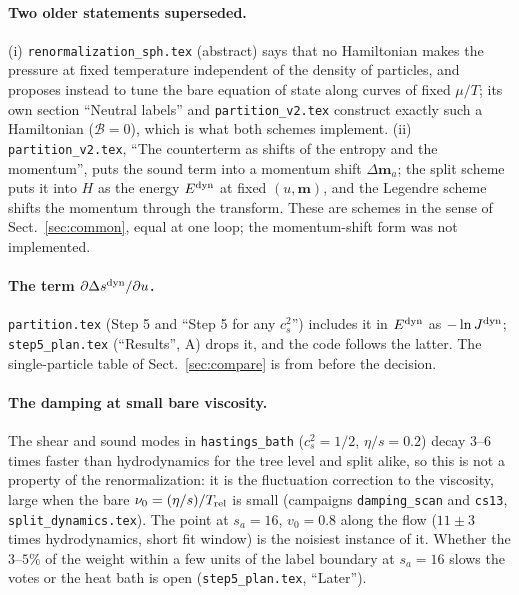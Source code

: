 \documentclass[11pt,aps,preprint,nofootinbib,superscriptaddress,tightenlines]{revtex4-2}
\newcommand{\klab}{\mathcal B}
\def\Sect#1{Sect.~\ref{#1}}
\let\oldparagraph\paragraph
\renewcommand{\paragraph}{\par\bigskip\oldparagraph}
\begin{document}
\paragraph{Two older statements superseded.}  (i) \nolinkurl{renormalization_sph.tex} (abstract) says that no Hamiltonian makes the pressure at fixed
temperature independent of the density of particles, and proposes instead to tune the bare equation of state along curves of fixed $\mu/T$; its own
section ``Neutral labels'' and \nolinkurl{partition_v2.tex} construct exactly such a Hamiltonian ($\klab=0$), which is what both schemes implement.
(ii) \nolinkurl{partition_v2.tex}, ``The counterterm as shifts of the entropy and the momentum'', puts the sound term into a momentum shift
$\Delta\bm m_a$; the split scheme puts it into $H$ as the energy $E^{\rm dyn}$ at fixed $(u,\bm m)$, and the Legendre scheme shifts the momentum through
the transform.  These are schemes in the sense of \Sect{sec:common}, equal at one loop; the momentum-shift form was not implemented.

\paragraph{The term $\partial\Delta s^{\rm dyn}/\partial u$.}  \nolinkurl{partition.tex} (Step 5 and ``Step 5 for any $c_s^2$'') includes it in $E^{\rm dyn}$ as
$-\ln J^{\rm dyn}$; \nolinkurl{step5_plan.tex} (``Results'', A) drops it, and the code follows the latter.  The single-particle table of
\Sect{sec:compare} is from before the decision.

\paragraph{The damping at small bare viscosity.}  The shear and sound modes in \texttt{hastings\_bath} ($c_s^2=1/2$, $\eta/s=0.2$) decay 3--6 times
faster than hydrodynamics for the tree level and split alike, so this is not a property of the renormalization: it is the fluctuation
correction to the viscosity, large when the bare $\nu_0=(\eta/s)/T_{\rm rel}$ is small (campaigns \texttt{damping\_scan} and \texttt{cs13},
\nolinkurl{split_dynamics.tex}).  The point at $s_a=16$, $v_0=0.8$ along the flow ($11\pm3$ times hydrodynamics, short fit window) is the
noisiest instance of it.  Whether the $3$--$5\%$ of the weight within a few units of the label boundary at $s_a=16$ slows the votes or the
heat bath is open (\nolinkurl{step5_plan.tex}, ``Later'').
\end{document}
